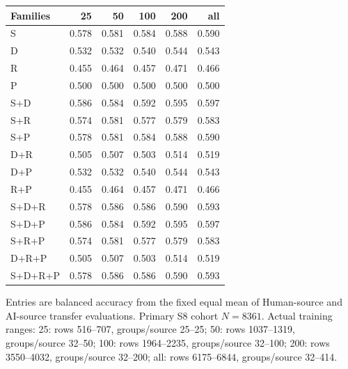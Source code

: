\begin{tabular}{lrrrrr}
\toprule
Families & 25 & 50 & 100 & 200 & all \\
\midrule
S & 0.578 & 0.581 & 0.584 & 0.588 & 0.590 \\
D & 0.532 & 0.532 & 0.540 & 0.544 & 0.543 \\
R & 0.455 & 0.464 & 0.457 & 0.471 & 0.466 \\
P & 0.500 & 0.500 & 0.500 & 0.500 & 0.500 \\
S+D & 0.586 & 0.584 & 0.592 & 0.595 & 0.597 \\
S+R & 0.574 & 0.581 & 0.577 & 0.579 & 0.583 \\
S+P & 0.578 & 0.581 & 0.584 & 0.588 & 0.590 \\
D+R & 0.505 & 0.507 & 0.503 & 0.514 & 0.519 \\
D+P & 0.532 & 0.532 & 0.540 & 0.544 & 0.543 \\
R+P & 0.455 & 0.464 & 0.457 & 0.471 & 0.466 \\
S+D+R & 0.578 & 0.586 & 0.586 & 0.590 & 0.593 \\
S+D+P & 0.586 & 0.584 & 0.592 & 0.595 & 0.597 \\
S+R+P & 0.574 & 0.581 & 0.577 & 0.579 & 0.583 \\
D+R+P & 0.505 & 0.507 & 0.503 & 0.514 & 0.519 \\
S+D+R+P & 0.578 & 0.586 & 0.586 & 0.590 & 0.593 \\
\bottomrule
\end{tabular}
\par\smallskip
{\footnotesize Entries are balanced accuracy from the fixed equal mean of Human-source and AI-source transfer evaluations. Primary S8 cohort $N=8361$. Actual training ranges: 25: rows 516--707, groups/source 25--25; 50: rows 1037--1319, groups/source 32--50; 100: rows 1964--2235, groups/source 32--100; 200: rows 3550--4032, groups/source 32--200; all: rows 6175--6844, groups/source 32--414.}
